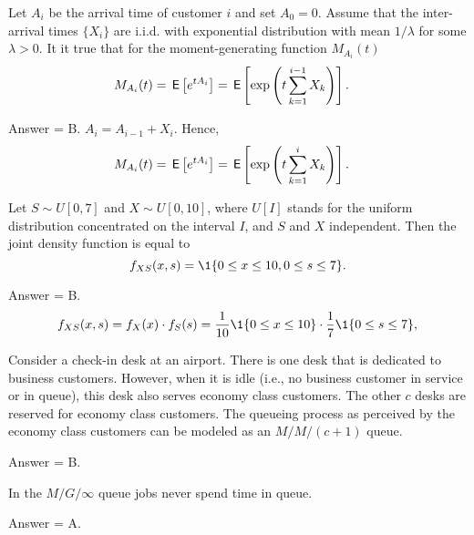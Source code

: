 \begin{exercise}[201902]
 Let $A_i$ be the arrival time of customer $i$ and set $A_0=0$.
 Assume that the inter-arrival times $\{X_i\}$ are i.i.d. with
 exponential distribution with mean $1/\lambda$ for some
 $\lambda>0$. It it true that for the moment-generating function $M_{A_i}(t)$
\begin{align*}
 M_{A_i}(t) &= \,\mathsf{E}\left[e^{t A_i}\right] = \,\mathsf{E}\left[\exp\left(t\sum_{k=1}^{i-1} X_k\right)\right].
\end{align*}

\begin{solution}
Answer = B. $A_i = A_{i-1} + X_i$. Hence, 
\begin{align*}
 M_{A_i}(t) &= \,\mathsf{E}\left[e^{t A_i}\right] = \,\mathsf{E}\left[\exp\left(t\sum_{k=1}^{i} X_k\right)\right].
\end{align*}
\end{solution}
\end{exercise}

\begin{exercise}[201902]
 Let $S\sim U[0,7]$ and $X\sim U[0,10]$, where $U[I]$ stands for the
 uniform distribution concentrated on the interval $I$, and $S$ and $X$ independent. Then the joint density function is equal to 
\begin{equation*}
 f_{X S}(x,s) = \1{0\leq x \leq 10, 0\leq s \leq 7}.
\end{equation*}
\begin{solution}
Answer = B. %
\begin{equation*}
 f_{X S}(x, s) = f_X(x) \cdot f_S(s) = \frac{1}{10} \1{0\leq x \leq 10}\cdot \frac 17 \1{0\leq s \leq 7},
\end{equation*}

\end{solution}
\end{exercise}

\begin{exercise}[201902]
Consider a check-in desk at an airport. There is one desk that is dedicated to business customers. However, when it is idle (i.e., no business customer in service or in queue), this desk also serves economy class customers. The other $c$ desks are reserved for economy class customers. The queueing process as perceived by the economy class customers can be modeled as an $M/M/(c+1)$ queue. 
\begin{solution}
Answer = B. 
\end{solution}
\end{exercise}

\begin{exercise}[201902]
In the $M/G/\infty$ queue jobs never spend time in queue.
\begin{solution}
Answer = A.
\end{solution}
\end{exercise}

